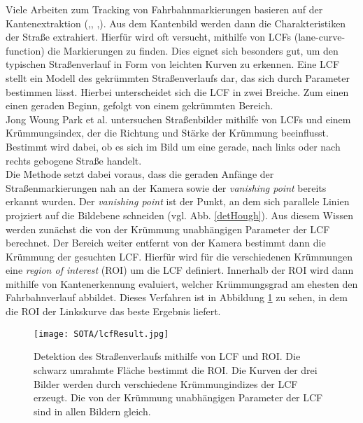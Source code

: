 Viele Arbeiten zum Tracking von Fahrbahnmarkierungen basieren auf der Kantenextraktion (\cite{Voisin2005},\cite{bai2010multiple}, \cite{Park20032301},\cite{wang2004lane}). Aus dem Kantenbild werden dann die Charakteristiken der Straße extrahiert.
Hierfür wird oft versucht, mithilfe von LCFs (lane-curve-function) die Markierungen zu finden. Dies eignet sich besonders gut, um den typischen Straßenverlauf in Form von leichten Kurven zu erkennen. Eine LCF stellt ein Modell des gekrümmten Straßenverlaufs dar, das sich durch Parameter bestimmen lässt. Hierbei unterscheidet sich die LCF in zwei Breiche. Zum einen einen geraden Beginn, gefolgt von einem gekrümmten Bereich.\\
Jong Woung Park et al.\cite{Park20032301} untersuchen Straßenbilder mithilfe von LCFs und einem Krümmungsindex, der die Richtung und Stärke der Krümmung beeinflusst. Bestimmt wird dabei, ob es sich im Bild um eine gerade, nach links oder nach rechts gebogene Straße handelt.\\
Die Methode setzt dabei voraus, dass die geraden Anfänge der Straßenmarkierungen nah an der Kamera sowie der \textit{vanishing point} bereits erkannt wurden. Der \textit{vanishing point} ist der Punkt, an dem sich parallele Linien projziert auf die Bildebene schneiden (vgl. Abb. \ref{detHough}). Aus diesem Wissen werden zunächst die von der Krümmung unabhängigen Parameter der LCF berechnet. Der Bereich weiter entfernt von der Kamera bestimmt dann die Krümmung der gesuchten LCF. Hierfür wird für die verschiedenen Krümmungen eine \textit{region of interest} (ROI) um die LCF definiert. Innerhalb der ROI wird dann mithilfe von Kantenerkennung evaluiert, welcher Krümmungsgrad am ehesten den Fahrbahnverlauf abbildet. Dieses Verfahren ist in Abbildung \ref{lcfDec} zu sehen, in dem die ROI der Linkskurve das beste Ergebnis liefert.
\begin{figure}[H]
	\centering
	\texttt{[image: SOTA/lcfResult.jpg]}
	\caption[Detektion eines Straßenverlaufs über eine LCF]{Detektion des Straßenverlaufs mithilfe von LCF und ROI. Die schwarz umrahmte Fläche bestimmt die ROI. Die Kurven der drei Bilder werden durch verschiedene Krümmungindizes der LCF erzeugt. Die von der Krümmung unabhängigen Parameter der LCF sind in allen Bildern gleich.}
	\label{lcfDec}
\end{figure}

